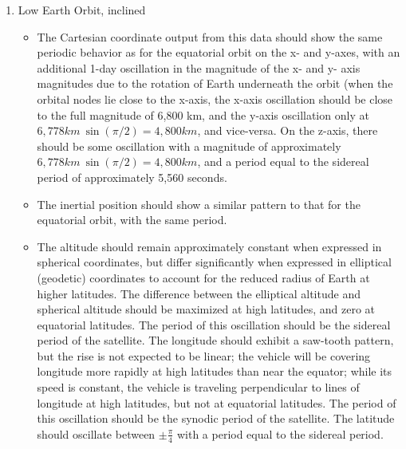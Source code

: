 \begin{description}
\begin{enumerate}
\item {Low Earth Orbit, inclined}
\begin{itemize}
\item{}The Cartesian coordinate output from this data should show the same periodic behavior as for the equatorial orbit on the x- and y-axes, with an additional 1-day oscillation in the magnitude of the x- and y- axis magnitudes due to the rotation of Earth underneath the orbit (when the orbital nodes lie close to the x-axis, the x-axis oscillation should be close to the full magnitude of 6,800 km, and the y-axis oscillation only at $6,778 km ~ \sin (\pi / 2) =  4,800 km$, and vice-versa.
On the z-axis, there should be some oscillation with a magnitude of approximately $6,778 km ~ \sin (\pi / 2) =  4,800 km$, and a period equal to the sidereal period of approximately 5,560 seconds.
\item{}The inertial position should show a similar pattern to that for the equatorial orbit, with the same period.
\item{}The altitude should remain approximately constant when expressed in spherical coordinates, but differ significantly when expressed in elliptical (geodetic) coordinates to account for the reduced radius of Earth at higher latitudes.  The difference between the elliptical altitude and spherical altitude should be maximized at high latitudes, and zero at equatorial latitudes.  The period of this oscillation should be the sidereal period of the satellite.
The longitude should exhibit a saw-tooth pattern, but the rise is not expected to be linear; the vehicle will be covering longitude more rapidly at high latitudes than near the equator; while its speed is constant, the vehicle is traveling perpendicular to lines of longitude at high latitudes, but not at equatorial latitudes.  The period of this oscillation should be the synodic period of the satellite.
The latitude should oscillate between $\pm \frac{\pi}{4}$ with a period equal to the sidereal period.
\end{itemize}


\end{enumerate}
\end{description}
